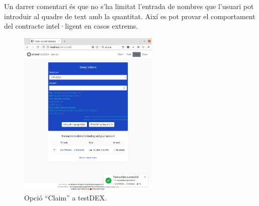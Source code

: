 \documentclass[11pt,a4paper]{article}
\begin{document}
Un darrer comentari és que no s'ha limitat l'entrada de nombres que l'usuari pot introduir al quadre de text amb la quantitat. Així es pot provar el comportament del contracte intel·ligent en casos extrems.
\begin{figure}[h]
\includegraphics[width=0.6\textwidth]{manualtrade.png}
\centering
\caption{Opció ``Claim'' a testDEX.}\label{fig:manualtrade}
\end{figure} 
\end{document}
